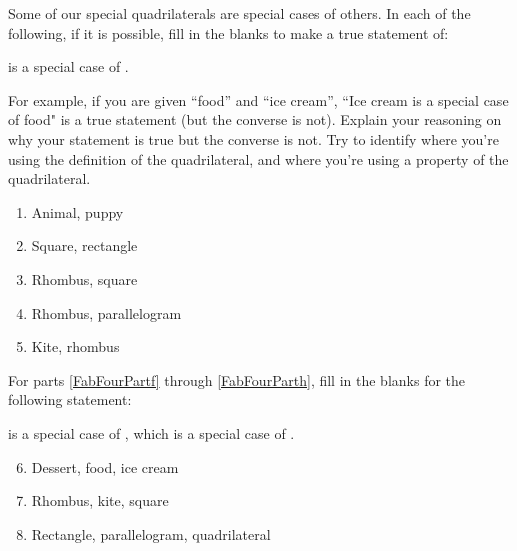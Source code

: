\documentclass[handout]{ximera}
\begin{document}
\begin{problem}
Some of our special quadrilaterals are special cases of others.  In each of the following, if it is possible, fill in the blanks to make a true statement of:

\begin{center} \underline{\hspace{1in}} is a special case of \underline{\hspace{1in}}. \end{center}

For example, if you are given ``food'' and ``ice cream'', ``Ice cream is a special case of food" is a true statement (but the converse is not).  Explain your reasoning on why your statement is true but the converse is not.  Try to identify where you're using the definition of the quadrilateral, and where you're using a property of the quadrilateral.
\begin{enumerate}
\item  Animal, puppy
\item  Square, rectangle
\item Rhombus, square
\item  Rhombus, parallelogram
\item  Kite, rhombus
\end{enumerate}

For parts \ref{FabFourPartf} through \ref{FabFourParth}, fill in the blanks for the following statement:

\begin{center} \underline{\hspace{0.5in}} is a special case of \underline{\hspace{0.5in}}, which is a special case of \underline{\hspace{0.5in}}. \end{center}

\begin{enumerate}
\setcounter{enumi}{5}
    \item Dessert, food, ice cream \label{FabFourPartf}
    \item  Rhombus, kite, square
    \item Rectangle, parallelogram, quadrilateral \label{FabFourParth}
\end{enumerate}


\end{problem}
\end{document}
